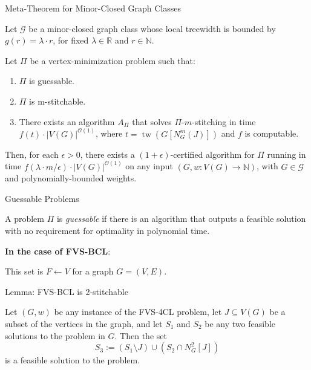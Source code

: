\documentclass{beamer}
\newcommand{\tw}{\operatorname{tw}}
\begin{document}
\begin{frame}{Meta-Theorem for Minor-Closed Graph Classes}

\begin{theorem}
Let $\mathcal{G}$ be a minor-closed graph class whose local treewidth is bounded by $g(r) = \lambda \cdot r$, for fixed $\lambda \in \mathbb{R}$ and $r \in \mathbb{N}$.

Let $\Pi$ be a vertex-minimization problem such that:
\begin{enumerate}
    \item $\Pi$ is guessable.
    \item $\Pi$ is m-stitchable.
    \item There exists an algorithm $A_\Pi$ that solves $\Pi$-$m$-stitching in time 
    $f(t) \cdot |V(G)|^{\mathcal{O}(1)}$, where $t = \tw(G[N_G^m(J)])$ and $f$ is computable.
\end{enumerate}

Then, for each $\epsilon > 0$, there exists a $(1 + \epsilon)$-certified algorithm for $\Pi$ 
running in time $f(\lambda \cdot m / \epsilon) \cdot |V(G)|^{\mathcal{O}(1)}$ on any input 
$(G, w : V(G) \to \mathbb{N})$, with $G \in \mathcal{G}$ and polynomially-bounded weights.
\end{theorem}

\end{frame}

\begin{frame}{Guessable Problems}
    \begin{definition}[Guessable]
        A problem $\Pi$ is \emph{guessable} if there is an algorithm that outputs a 
        feasible solution 
        with no requirement for optimality in polynomial time.
    \end{definition}

    \textbf{In the case of FVS-BCL}:

    This set is $F \leftarrow V$ for a graph $G = (V, E)$.
\end{frame}

\begin{frame}{Lemma: FVS-BCL is 2-stitchable}
  \begin{lemma}
    Let $(G, w)$ be any instance of the FVS-4CL problem, let $J \subseteq V(G)$ be a subset
    of the vertices in the graph, and let $S_1$ and $S_2$ be any two feasible solutions 
    to the problem in $G$. Then the set
    \[
    S_3 := (S_1 \setminus J) \cup (S_2 \cap N^{2}_{G}[J])
    \]
    is a feasible solution to the problem.
  \end{lemma}
\end{frame}
\end{document}
